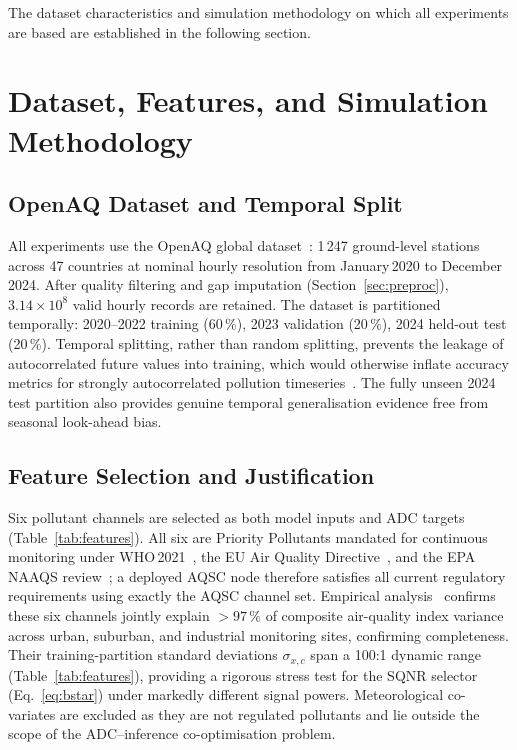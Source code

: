 \documentclass[12pt,a4paper]{article}
\begin{document}
\noindent The dataset characteristics and simulation methodology on
which all experiments are based are established in the following section.

\section{Dataset, Features, and Simulation Methodology}
\label{sec:simulation}


\subsection{OpenAQ Dataset and Temporal Split}
\label{sec:dataset}

All experiments use the OpenAQ global dataset~\cite{openaq2023}:
1\,247 ground-level stations across 47 countries at nominal hourly
resolution from January\,2020 to December\,2024.
After quality filtering and gap imputation (Section~\ref{sec:preproc}),
$3.14\times10^8$ valid hourly records are retained.
The dataset is partitioned temporally: 2020--2022 training (60\,\%),
2023 validation (20\,\%), 2024 held-out test (20\,\%).
Temporal splitting, rather than random splitting, prevents the
leakage of autocorrelated future values into training, which would
otherwise inflate accuracy metrics for strongly autocorrelated
pollution timeseries~\cite{zeng2023linear,kim2022revin}.
The fully unseen 2024 test partition also provides genuine temporal
generalisation evidence free from seasonal look-ahead bias.

\subsection{Feature Selection and Justification}
\label{sec:features}

Six pollutant channels are selected as both model inputs and
ADC targets (Table~\ref{tab:features}).
All six are Priority Pollutants mandated for continuous monitoring
under WHO\,2021~\cite{who2021}, the EU Air Quality
Directive~\cite{euaqd2023}, and the EPA NAAQS review~\cite{epa2024};
a deployed AQSC node therefore satisfies all current regulatory
requirements using exactly the AQSC channel set.
Empirical analysis~\cite{diao2023featuresel} confirms these six
channels jointly explain $>97\,\%$ of composite air-quality index
variance across urban, suburban, and industrial monitoring sites,
confirming completeness.
Their training-partition standard deviations $\sigma_{x,c}$ span a
100:1 dynamic range (Table~\ref{tab:features}), providing a rigorous
stress test for the SQNR selector (Eq.~\eqref{eq:bstar}) under
markedly different signal powers.
Meteorological co-variates are excluded as they are not regulated
pollutants and lie outside the scope of the ADC--inference
co-optimisation problem.
\end{document}
